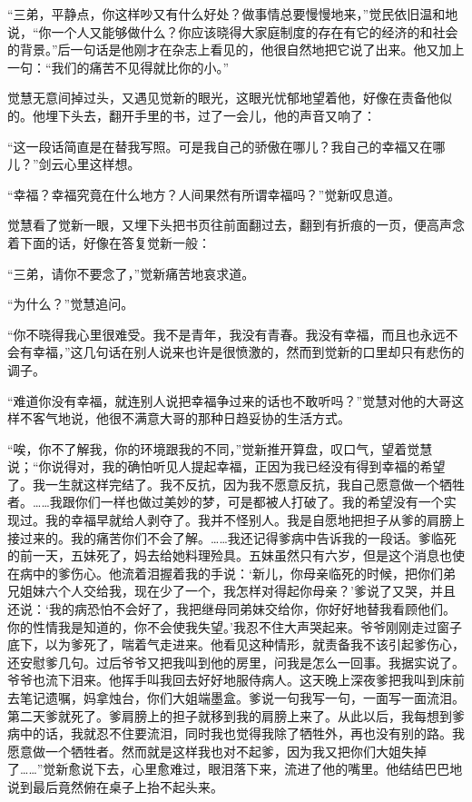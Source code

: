 \par “三弟，平静点，你这样吵又有什么好处？做事情总要慢慢地来，”觉民依旧温和地说，“你一个人又能够做什么？你应该晓得大家庭制度的存在有它的经济的和社会的背景。”后一句话是他刚才在杂志上看见的，他很自然地把它说了出来。他又加上一句：“我们的痛苦不见得就比你的小。”
\par 觉慧无意间掉过头，又遇见觉新的眼光，这眼光忧郁地望着他，好像在责备他似的。他埋下头去，翻开手里的书，过了一会儿，他的声音又响了：
\par “这一段话简直是在替我写照。可是我自己的骄傲在哪儿？我自己的幸福又在哪儿？”剑云心里这样想。
\par “幸福？幸福究竟在什么地方？人间果然有所谓幸福吗？”觉新叹息道。
\par 觉慧看了觉新一眼，又埋下头把书页往前面翻过去，翻到有折痕的一页，便高声念着下面的话，好像在答复觉新一般：
\par “三弟，请你不要念了，”觉新痛苦地哀求道。
\par “为什么？”觉慧追问。
\par “你不晓得我心里很难受。我不是青年，我没有青春。我没有幸福，而且也永远不会有幸福，”这几句话在别人说来也许是很愤激的，然而到觉新的口里却只有悲伤的调子。
\par “难道你没有幸福，就连别人说把幸福争过来的话也不敢听吗？”觉慧对他的大哥这样不客气地说，他很不满意大哥的那种日趋妥协的生活方式。
\par “唉，你不了解我，你的环境跟我的不同，”觉新推开算盘，叹口气，望着觉慧说；“你说得对，我的确怕听见人提起幸福，正因为我已经没有得到幸福的希望了。我一生就这样完结了。我不反抗，因为我不愿意反抗，我自己愿意做一个牺牲者。……我跟你们一样也做过美妙的梦，可是都被人打破了。我的希望没有一个实现过。我的幸福早就给人剥夺了。我并不怪别人。我是自愿地把担子从爹的肩膀上接过来的。我的痛苦你们不会了解。……我还记得爹病中告诉我的一段话。爹临死的前一天，五妹死了，妈去给她料理殓具。五妹虽然只有六岁，但是这个消息也使在病中的爹伤心。他流着泪握着我的手说：‘新儿，你母亲临死的时候，把你们弟兄姐妹六个人交给我，现在少了一个，我怎样对得起你母亲？’爹说了又哭，并且还说：‘我的病恐怕不会好了，我把继母同弟妹交给你，你好好地替我看顾他们。你的性情我是知道的，你不会使我失望。’我忍不住大声哭起来。爷爷刚刚走过窗子底下，以为爹死了，喘着气走进来。他看见这种情形，就责备我不该引起爹伤心，还安慰爹几句。过后爷爷又把我叫到他的房里，问我是怎么一回事。我据实说了。爷爷也流下泪来。他挥手叫我回去好好地服侍病人。这天晚上深夜爹把我叫到床前去笔记遗嘱，妈拿烛台，你们大姐端墨盒。爹说一句我写一句，一面写一面流泪。第二天爹就死了。爹肩膀上的担子就移到我的肩膀上来了。从此以后，我每想到爹病中的话，我就忍不住要流泪，同时我也觉得我除了牺牲外，再也没有别的路。我愿意做一个牺牲者。然而就是这样我也对不起爹，因为我又把你们大姐失掉了……”觉新愈说下去，心里愈难过，眼泪落下来，流进了他的嘴里。他结结巴巴地说到最后竟然俯在桌子上抬不起头来。
